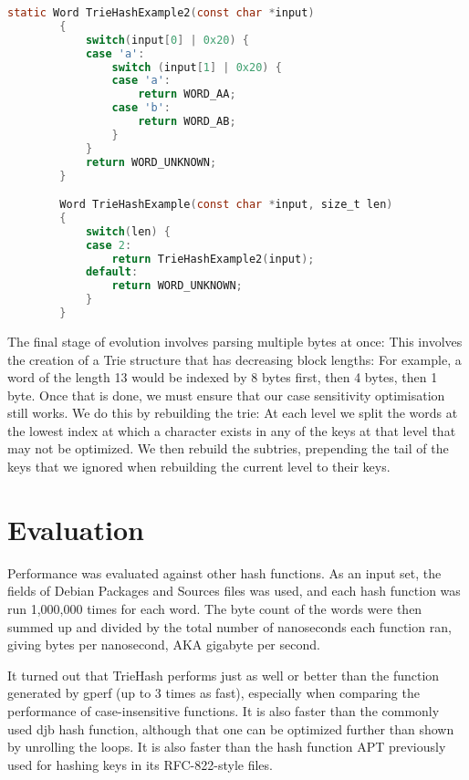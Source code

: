 \documentclass[parskip=half]{scrartcl}
\begin{document}
        \begin{lstlisting}[language=C,gobble=8,label=lst:ascii,caption=Case-Insensitive Length-Indexed TrieHash,frame=tb]
        static Word TrieHashExample2(const char *input)
        {
            switch(input[0] | 0x20) {
            case 'a':
                switch (input[1] | 0x20) {
                case 'a':
                    return WORD_AA;
                case 'b':
                    return WORD_AB;
                }
            }
            return WORD_UNKNOWN;
        }

        Word TrieHashExample(const char *input, size_t len)
        {
            switch(len) {
            case 2:
                return TrieHashExample2(input);
            default:
                return WORD_UNKNOWN;
            }
        }
    \end{lstlisting}


    The final stage of evolution involves parsing multiple bytes at once: This
    involves the creation of a Trie structure that has decreasing block lengths:
    For example, a word of the length 13 would be indexed by 8 bytes first, then
    4 bytes, then 1 byte. Once that is done, we must ensure that our case sensitivity
    optimisation still works. We do this by rebuilding the trie: At each level
    we split the words at the lowest index at which a character exists in any
    of the keys at that level that may not be optimized. We then rebuild the
    subtries, prepending the tail of the keys that we ignored when rebuilding
    the current level to their keys.

    
    
    \section{Evaluation}
Performance was evaluated against other hash functions. As an input set,
the fields of Debian Packages and Sources files was used, and each hash
function was run 1,000,000 times for each word. The byte count of the
words were then summed up and divided by the total number of nanoseconds
each function ran, giving bytes per nanosecond, AKA gigabyte per second.

It turned out that TrieHash performs just as well or better than the function
generated by gperf (up to 3 times as fast), especially when comparing the performance
of case-insensitive functions. It is also faster than the commonly used djb hash
function, although that one can be optimized further than shown by unrolling
the loops. It is also faster than the hash function APT previously used for
hashing keys in its RFC-822-style files.
\end{document}
